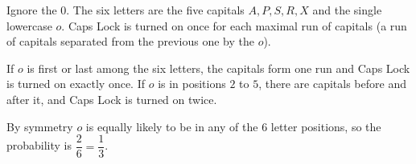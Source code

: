 Ignore the $0$. The six letters are the five capitals $A,P,S,R,X$ and the single lowercase $o$. Caps Lock is turned on once for each maximal run of capitals (a run of capitals separated from the previous one by the $o$).

If $o$ is first or last among the six letters, the capitals form one run and Caps Lock is turned on exactly once. If $o$ is in positions $2$ to $5$, there are capitals before and after it, and Caps Lock is turned on twice.

By symmetry $o$ is equally likely to be in any of the $6$ letter positions, so the probability is $\dfrac{2}{6}=\boxed{\dfrac{1}{3}}$.

